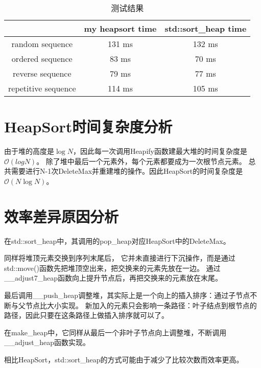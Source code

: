 \documentclass[UTF8]{ctexart}
\begin{document}
\begin{table}[htbp] 
\centering 
\caption{测试结果} 
\begin{tabular}{|c|c|c|} 
\hline 
   \   & my heapsort time & std::sort\_heap time \\ \hline 
random sequence & 131 ms & 132 ms \\ \hline
ordered sequence & 83 ms & 70 ms \\ \hline
reverse sequence & 79 ms & 77 ms \\ \hline
repetitive sequence & 114 ms & 105 ms \\\hline
\end{tabular}
\end{table}

\section{HeapSort时间复杂度分析}
由于堆的高度是$\log N$，因此每一次调用Heapify函数建最大堆的时间复杂度是$\mathcal{O}(log N)$。
除了堆中最后一个元素外，每个元素都要成为一次根节点元素。
总共需要进行N-1次DeleteMax并重建堆的操作。因此HeapSort的时间复杂度是$\mathcal{O}(N \log N)$。

\section{效率差异原因分析}
在std::sort\_heap中，其调用的pop\_heap对应HeapSort中的DeleteMax。

同样将堆顶元素交换到序列末尾后，
它并未直接进行下沉操作，而是通过std::move()函数先把堆顶空出来，把交换来的元素先放在一边。
通过\_\_adjust7\_heap函数向上提升节点后，再把交换来的元素放在末尾。

最后调用\_\_push\_heap调整堆，其实际上是一个向上的插入排序：通过子节点不断与父节点比大小实现。
新加入的元素只会影响一条路径：叶子结点到根节点的路径，因此只要在这条路径上做插入排序就可以了。

在make\_heap中，它同样从最后一个非叶子节点向上调整堆，不断调用\_\_adjust\_heap函数实现。

相比HeapSort，std::sort\_heap的方式可能由于减少了比较次数而效率更高。
\end{document}
